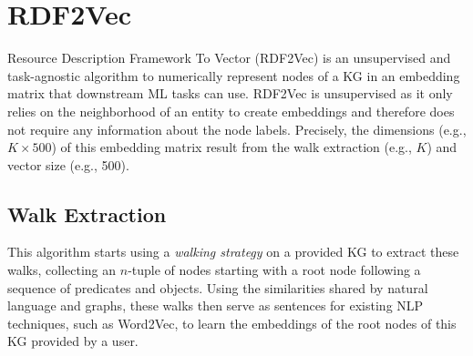 
\chapter{RDF2Vec}
\label{chap:rdf2vec}

Resource Description Framework To Vector (RDF2Vec) is an unsupervised and
task-agnostic algorithm to numerically represent nodes of a KG in an embedding
matrix that downstream ML tasks can use. RDF2Vec is unsupervised as it only
relies on the neighborhood of an entity to create embeddings and therefore does
not require any information about the node labels. Precisely, the dimensions
(e.g., $K \times 500$) of this embedding matrix result from the walk extraction
(e.g., $K$) and vector size (e.g., 500).

\section{Walk Extraction}
\label{sec:rdf2vec:walk:extraction}

This algorithm starts using a \emph{walking strategy} on a provided KG to
extract these walks, collecting an $n$-tuple of nodes starting with a root node
following a sequence of predicates and objects. Using the similarities shared by
natural language and graphs, these walks then serve as sentences for existing
NLP techniques, such as Word2Vec, to learn the embeddings of the root nodes of
this KG provided by a user.

